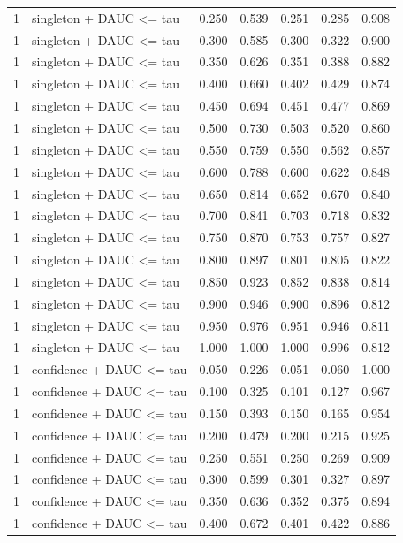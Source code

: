 \begin{tabular}{rlrrrrr}
1 & singleton + DAUC <= tau & 0.250 & 0.539 & 0.251 & 0.285 & 0.908 \\
1 & singleton + DAUC <= tau & 0.300 & 0.585 & 0.300 & 0.322 & 0.900 \\
1 & singleton + DAUC <= tau & 0.350 & 0.626 & 0.351 & 0.388 & 0.882 \\
1 & singleton + DAUC <= tau & 0.400 & 0.660 & 0.402 & 0.429 & 0.874 \\
1 & singleton + DAUC <= tau & 0.450 & 0.694 & 0.451 & 0.477 & 0.869 \\
1 & singleton + DAUC <= tau & 0.500 & 0.730 & 0.503 & 0.520 & 0.860 \\
1 & singleton + DAUC <= tau & 0.550 & 0.759 & 0.550 & 0.562 & 0.857 \\
1 & singleton + DAUC <= tau & 0.600 & 0.788 & 0.600 & 0.622 & 0.848 \\
1 & singleton + DAUC <= tau & 0.650 & 0.814 & 0.652 & 0.670 & 0.840 \\
1 & singleton + DAUC <= tau & 0.700 & 0.841 & 0.703 & 0.718 & 0.832 \\
1 & singleton + DAUC <= tau & 0.750 & 0.870 & 0.753 & 0.757 & 0.827 \\
1 & singleton + DAUC <= tau & 0.800 & 0.897 & 0.801 & 0.805 & 0.822 \\
1 & singleton + DAUC <= tau & 0.850 & 0.923 & 0.852 & 0.838 & 0.814 \\
1 & singleton + DAUC <= tau & 0.900 & 0.946 & 0.900 & 0.896 & 0.812 \\
1 & singleton + DAUC <= tau & 0.950 & 0.976 & 0.951 & 0.946 & 0.811 \\
1 & singleton + DAUC <= tau & 1.000 & 1.000 & 1.000 & 0.996 & 0.812 \\
1 & confidence + DAUC <= tau & 0.050 & 0.226 & 0.051 & 0.060 & 1.000 \\
1 & confidence + DAUC <= tau & 0.100 & 0.325 & 0.101 & 0.127 & 0.967 \\
1 & confidence + DAUC <= tau & 0.150 & 0.393 & 0.150 & 0.165 & 0.954 \\
1 & confidence + DAUC <= tau & 0.200 & 0.479 & 0.200 & 0.215 & 0.925 \\
1 & confidence + DAUC <= tau & 0.250 & 0.551 & 0.250 & 0.269 & 0.909 \\
1 & confidence + DAUC <= tau & 0.300 & 0.599 & 0.301 & 0.327 & 0.897 \\
1 & confidence + DAUC <= tau & 0.350 & 0.636 & 0.352 & 0.375 & 0.894 \\
1 & confidence + DAUC <= tau & 0.400 & 0.672 & 0.401 & 0.422 & 0.886 \\

\end{tabular}
